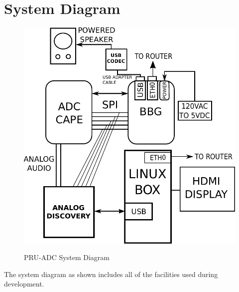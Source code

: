 %
%
%

\chapter{System Diagram}


\begin{figure}[h]
\centering
\includegraphics[width=\textwidth]{diagrams/system_ink}
\centering\bfseries
\caption{PRU-ADC System Diagram}
\end{figure}

The system diagram as shown includes all of the facilities used during development.

